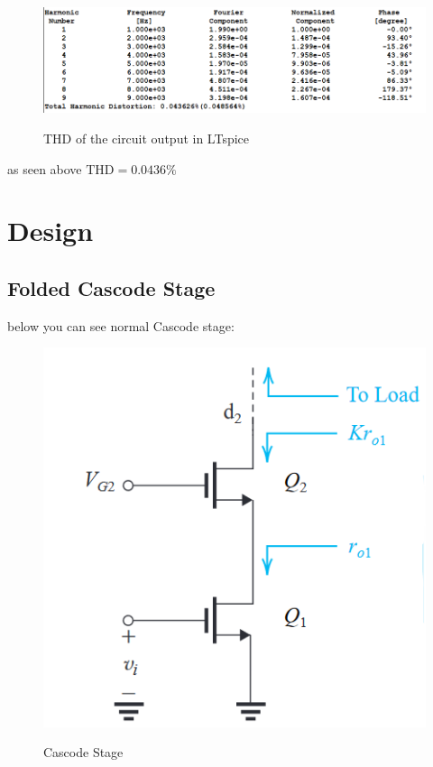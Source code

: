 \documentclass[11pt]{article}
\begin{document}
\begin{figure}[H]
    \begin{center}
        \includegraphics[scale=0.8]{Fig/THDBasic.png}
        \label{fig:THDBasic}
        \caption{THD of the circuit output in LTspice}
    \end{center}
\end{figure}
as seen above $ \text{THD} = 0.0436\% $

\section{Design}

\subsection{Folded Cascode Stage}
below you can see normal Cascode stage: \\
\begin{figure}[H]
    \begin{center}
        \includegraphics[scale=0.8]{Fig/cascode.png}
        \label{fig:cascode}
        \caption{Cascode Stage}
    \end{center}
\end{figure}
\end{document}
